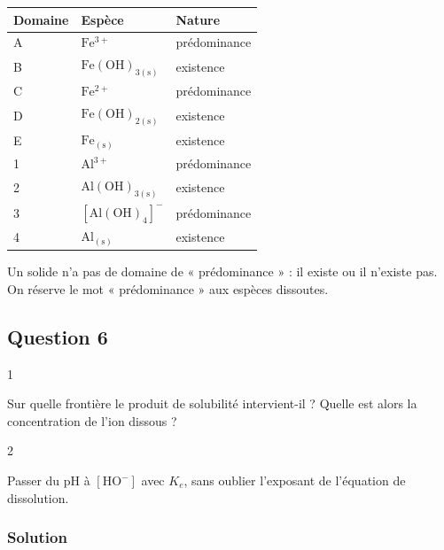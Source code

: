\documentclass[11pt,a4paper]{article}
\begin{document}
\begin{longtable}[]{@{}lll@{}}
\toprule\noalign{}
Domaine & Espèce & Nature \\
\midrule\noalign{}
\endhead
\bottomrule\noalign{}
\endlastfoot
A & \(\mathrm{Fe^{3+}}\) & prédominance \\
B & \(\mathrm{Fe(OH)_{3(s)}}\) & existence \\
C & \(\mathrm{Fe^{2+}}\) & prédominance \\
D & \(\mathrm{Fe(OH)_{2(s)}}\) & existence \\
E & \(\mathrm{Fe_{(s)}}\) & existence \\
1 & \(\mathrm{Al^{3+}}\) & prédominance \\
2 & \(\mathrm{Al(OH)_{3(s)}}\) & existence \\
3 & \([\mathrm{Al(OH)_4}]^-\) & prédominance \\
4 & \(\mathrm{Al_{(s)}}\) & existence \\
\end{longtable}

\begin{piege}

Un solide n'a pas de domaine de « prédominance » : il existe ou il n'existe pas. On réserve le mot « prédominance » aux espèces dissoutes.

\end{piege}

\hypertarget{question-6}{%
\subsection{Question 6}\label{question-6}}

\begin{indication}{1}

Sur quelle frontière le produit de solubilité intervient-il ? Quelle est alors la concentration de l'ion dissous ?

\end{indication}

\begin{indication}{2}

Passer du pH à \([\mathrm{HO^-}]\) avec \(K_e\), sans oublier l'exposant de l'équation de dissolution.

\end{indication}

\hypertarget{solution-5}{%
\subsubsection{Solution}\label{solution-5}}
\end{document}

